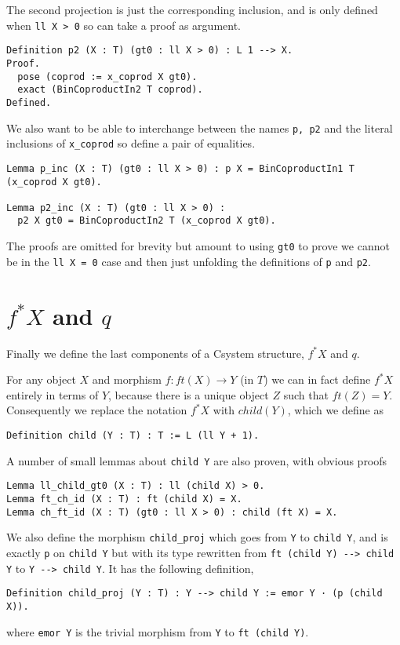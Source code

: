 The second projection is just the corresponding inclusion, and is only defined
when \lstinline|ll X > 0| so can take a proof as argument.
\begin{lstlisting}
Definition p2 (X : T) (gt0 : ll X > 0) : L 1 --> X.
Proof.
  pose (coprod := x_coprod X gt0).
  exact (BinCoproductIn2 T coprod).
Defined.
\end{lstlisting}

We also want to be able to interchange between the names \lstinline|p, p2| and the
literal inclusions of \lstinline|x_coprod| so define a pair of equalities.
\begin{lstlisting}
Lemma p_inc (X : T) (gt0 : ll X > 0) : p X = BinCoproductIn1 T (x_coprod X gt0).

Lemma p2_inc (X : T) (gt0 : ll X > 0) : 
  p2 X gt0 = BinCoproductIn2 T (x_coprod X gt0).
\end{lstlisting}
The proofs are omitted for brevity but amount to using \lstinline|gt0| to prove we
cannot be in the \lstinline|ll X = 0| case and then just unfolding the definitions of
\lstinline|p| and \lstinline|p2|.

\section{$f^*X$ and $q$}
Finally we define the last components of a Csystem structure, $f^*X$ and $q$.

For any object $X$ and morphism $f : ft(X)\to Y$ (in $T$) we can in fact define
$f^*X$ entirely in terms of $Y$, because there is a unique object $Z$ such that
$ft(Z) = Y$. Consequently we replace the notation $f^*X$ with $child(Y)$, which
we define as
\begin{lstlisting}
Definition child (Y : T) : T := L (ll Y + 1).
\end{lstlisting}

A number of small lemmas about \lstinline|child Y| are also proven, with obvious
proofs
\begin{lstlisting}
Lemma ll_child_gt0 (X : T) : ll (child X) > 0.
Lemma ft_ch_id (X : T) : ft (child X) = X.
Lemma ch_ft_id (X : T) (gt0 : ll X > 0) : child (ft X) = X.
\end{lstlisting}

We also define the morphism \lstinline|child_proj| which goes from \lstinline|Y|
to \lstinline|child Y|, and is exactly \lstinline|p| on \lstinline|child Y| but
with its type rewritten from \lstinline|ft (child Y) --> child Y| to
\lstinline|Y --> child Y|. It has the following definition,
\begin{lstlisting}
Definition child_proj (Y : T) : Y --> child Y := emor Y · (p (child X)).
\end{lstlisting}
where \lstinline|emor Y| is the trivial morphism from \lstinline|Y| to 
\lstinline|ft (child Y)|.

